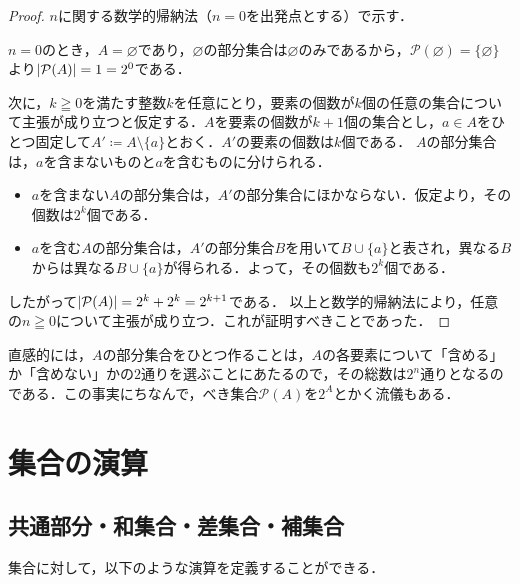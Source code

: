 \begin{tleftbar}
  \begin{proof}
    $n$に関する数学的帰納法（$n = 0$を出発点とする）で示す．

    $n = 0$のとき，$A = \varnothing$であり，$\varnothing$の部分集合は$\varnothing$のみであるから，$\mathcal{P}(\varnothing) = \{ \varnothing \}$より$\lvert\mathcal{P}(A)\rvert = 1 = 2^0$である．

    次に，$k \geqq 0$を満たす整数$k$を任意にとり，要素の個数が$k$個の任意の集合について主張が成り立つと仮定する．$A$を要素の個数が$k + 1$個の集合とし，$a \in A$をひとつ固定して$A' \coloneqq A \setminus \{a\}$とおく．$A'$の要素の個数は$k$個である．
    $A$の部分集合は，$a$を含まないものと$a$を含むものに分けられる．
    \begin{itemize}
      \item $a$を含まない$A$の部分集合は，$A'$の部分集合にほかならない．仮定より，その個数は$2^k$個である．
      \item $a$を含む$A$の部分集合は，$A'$の部分集合$B$を用いて$B \cup \{a\}$と表され，異なる$B$からは異なる$B \cup \{a\}$が得られる．よって，その個数も$2^k$個である．
    \end{itemize}
    したがって$\lvert\mathcal{P}(A)\rvert = 2^k + 2^k = 2^{k+1}$である．
    以上と数学的帰納法により，任意の$n \geqq 0$について主張が成り立つ．これが証明すべきことであった．
  \end{proof}
\end{tleftbar}

直感的には，$A$の部分集合をひとつ作ることは，$A$の各要素について「含める」か「含めない」かの$2$通りを選ぶことにあたるので，その総数は$2^n$通りとなるのである．この事実にちなんで，べき集合$\mathcal{P}(A)$を$2^A$とかく流儀もある．



\section{集合の演算}

\subsection{共通部分・和集合・差集合・補集合}
集合に対して，以下のような演算を定義することができる．

